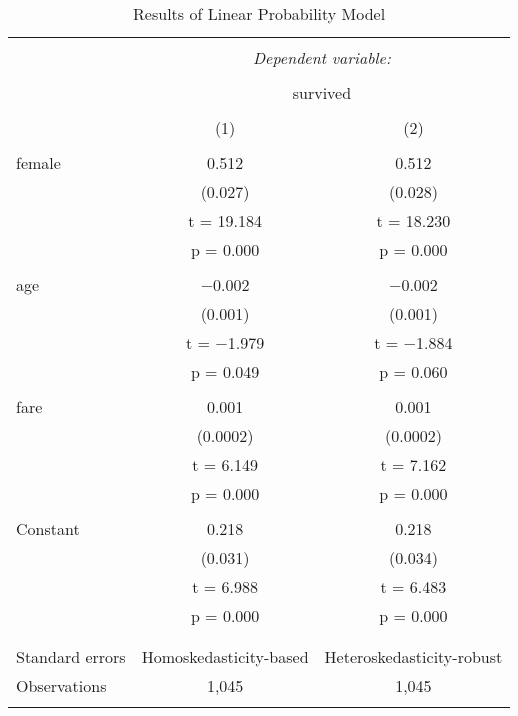 \documentclass[
  12pt,
]{article}
\begin{document}
\begin{table}[!htbp] \centering 
  \caption{Results of Linear Probability Model} 
  \label{} 
\small 
\begin{tabular}{@{\extracolsep{5pt}}lcc} 
\\[-1.8ex]\hline 
\hline \\[-1.8ex] 
 & \multicolumn{2}{c}{\textit{Dependent variable:}} \\ 
\cline{2-3} 
\\[-1.8ex] & \multicolumn{2}{c}{survived} \\ 
\\[-1.8ex] & (1) & (2)\\ 
\hline \\[-1.8ex] 
 female & 0.512 & 0.512 \\ 
  & (0.027) & (0.028) \\ 
  & t = 19.184 & t = 18.230 \\ 
  & p = 0.000 & p = 0.000 \\ 
  & & \\ 
 age & $-$0.002 & $-$0.002 \\ 
  & (0.001) & (0.001) \\ 
  & t = $-$1.979 & t = $-$1.884 \\ 
  & p = 0.049 & p = 0.060 \\ 
  & & \\ 
 fare & 0.001 & 0.001 \\ 
  & (0.0002) & (0.0002) \\ 
  & t = 6.149 & t = 7.162 \\ 
  & p = 0.000 & p = 0.000 \\ 
  & & \\ 
 Constant & 0.218 & 0.218 \\ 
  & (0.031) & (0.034) \\ 
  & t = 6.988 & t = 6.483 \\ 
  & p = 0.000 & p = 0.000 \\ 
  & & \\ 
\hline \\[-1.8ex] 
Standard errors & Homoskedasticity-based & Heteroskedasticity-robust \\ 
Observations & 1,045 & 1,045 \\ 
\hline 
\hline \\[-1.8ex] 
\end{tabular} 
\end{table}
\end{document}
